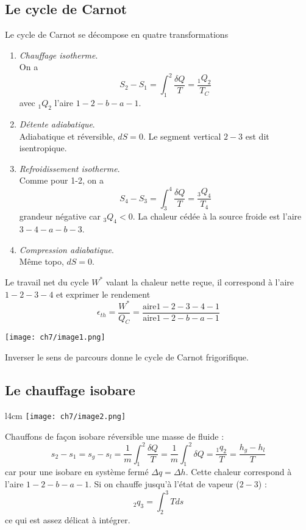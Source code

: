 		\subsection{Le cycle de Carnot}
		Le cycle de Carnot se décompose en quatre transformations
		\begin{enumerate}
		\item \textit{Chauffage isotherme}.\\
		On a 
		\begin{equation}
		S_2-S_1 = \int_1^2 \dfrac{\delta Q}{T} = \dfrac{_1Q_2}{T_C}
		\end{equation}
		avec $_1Q_2$ l'aire $1-2-b-a-1$.
		\item \textit{Détente adiabatique}.\\
		Adiabatique et réversible, $dS=0$. Le segment vertical $2-3$ est dit 
		isentropique.
		\item \textit{Refroidissement isotherme}.\\
		Comme pour 1-2, on a
		\begin{equation}
		S_4-S_3 = \int_3^4 \dfrac{\delta Q}{T} = \dfrac{_3Q_4}{T_4}
		\end{equation}		
		grandeur négative car $_3Q_4<0$. La chaleur cédée à la source froide est 
		l'aire $3-4-a-b-3$.
		\item \textit{Compression adiabatique}.\\
		Même topo, $dS=0$.
		\end{enumerate}
		Le travail net du cycle $W^*$ valant la chaleur nette reçue, il correspond 
		à l'aire $1-2-3-4$ et exprimer le rendement 
		\begin{equation}
		\epsilon_{th} = \dfrac{W^*}{Q_C} = \frac{\text{aire} 1-2-3-4-1}{\text{aire} 
		1-2-b-a-1}
		\end{equation}
			\begin{center}
	\texttt{[image: ch7/image1.png]}
	\end{center}
		Inverser le sens de parcours donne le cycle de Carnot frigorifique.
		
		\subsection{Le chauffage isobare}
		\begin{wrapfigure}[10]{l}{4cm}
		\vspace{-5mm}
		\texttt{[image: ch7/image2.png]}
		\end{wrapfigure}
		Chauffons de façon isobare réversible une masse de fluide  :
		\begin{equation}
		s_2-s_1 = s_g-s_l = \dfrac{1}{m}\int_1^2 \dfrac{\delta Q}{T} = \dfrac{1}{m}
		\int_1^2 \delta Q = \dfrac{_1q_2}{T} = \dfrac{h_g-h_l}{T}
		\end{equation}
		car pour une isobare en système fermé $\Delta q = \Delta h$. Cette chaleur 
		correspond à l'aire $1-2-b-a-1$. Si on chauffe jusqu'à l'état de vapeur ($2-3$) :
		\begin{equation}
		_2q_3 = \int_2^3 Tds
		\end{equation}
		ce qui est assez délicat à intégrer.
	
